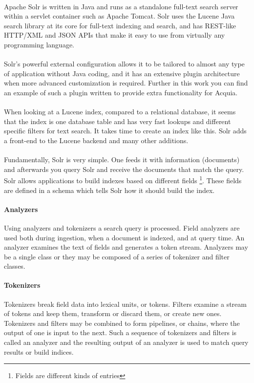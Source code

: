 \paragraph{}
Apache Solr is written in Java and runs as a standalone full-text search server within a servlet container such as Apache Tomcat. Solr uses the Lucene Java search library at its core for full-text indexing and search, and has REST-like HTTP/XML and JSON APIs that make it easy to use from virtually any programming language. 
\paragraph{}
Solr's powerful external configuration allows it to be tailored to almost any type of application without Java coding, and it has an extensive plugin architecture when more advanced customization is required. Further in this work you can find an example of such a plugin written to provide extra functionality for Acquia.
\paragraph{}
When looking at a Lucene index, compared to a relational database, it seems that the index is one database table and has very fast lookups and different specific filters for text search. It takes time to create an index like this. Solr adds a front-end to the Lucene backend and many other additions.
\paragraph{}
Fundamentally, Solr is very simple. One feeds it with information (documents) and afterwards you query Solr and receive the documents that match the query. Solr allows applications to build indexes based on different fields \footnote{Fields are different kinds of entries}. These fields are defined in a schema which tells Solr how it should build the index.
\paragraph{Analyzers}
Using analyzers and tokenizers a search query is processed. Field analyzers are used both during ingestion, when a document is indexed, and at query time. An analyzer examines the text of fields and generates a token stream. Analyzers may be a single class or they may be composed of a series of tokenizer and filter classes.
\paragraph{Tokenizers}
Tokenizers break field data into lexical units, or tokens. Filters examine a stream of tokens and keep them, transform or discard them, or create new ones. Tokenizers and filters may be combined to form pipelines, or chains, where the output of one is input to the next. Such a sequence of tokenizers and filters is called an analyzer and the resulting output of an analyzer is used to match query results or build indices.
